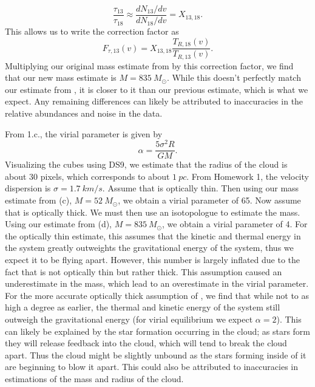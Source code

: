 \documentclass[11pt]{article}
\newenvironment{tight_enumerate}{
\begin{enumerate}[label=(\alph*)]
\setlength{\itemsep}{3pt}
\setlength{\parskip}{0pt}
}{\end{enumerate}}
\begin{document}
\begin{tight_enumerate}
\[\frac{\tau_{13}}{\tau_{18}} \approx \frac{dN_{13}/dv}{dN_{18}/dv} = X_{13,18}.\]
This allows us to write the correction factor as 
\[F_{\tau,13}(v) = X_{13,18}\frac{T_{R,18}(v)}{T_{R,13}(v)}.\]
Multiplying our original mass estimate from  by this correction factor, we find that our new mass estimate is $M = 835\ M_{\odot}$. While this doesn't perfectly match our estimate from , it is closer to it than our previous estimate, which is what we expect. Any remaining differences can likely be attributed to inaccuracies in the relative abundances and noise in the data. 
\item From 1.c., the virial parameter is given by 
\[\alpha = \frac{5\sigma^{2}R}{GM}.\]
Visualizing the cubes using DS9, we estimate that the radius of the cloud is about $30$ pixels, which corresponds to about $1\ \si{pc}$. From Homework 1, the velocity dispersion is $\sigma = 1.7\ \si{km/s}$. Assume that  is optically thin. Then using our mass estimate from (c), $M = 52\ M_{\odot}$, we obtain a virial parameter of 65. Now assume that  is optically thick. We must then use an isotopologue to estimate the mass. Using our estimate from (d), $M = 835\ M_{\odot}$, we obtain a virial parameter of 4. For the optically thin estimate, this assumes that the kinetic and thermal energy in the system greatly outweights the gravitational energy of the system, thus we expect it to be flying apart. However, this number is largely inflated due to the fact that  is not optically thin but rather thick. This assumption caused an underestimate in the mass, which lead to an overestimate in the virial parameter. For the more accurate optically thick assumption of , we find that while not to as high a degree as earlier, the thermal and kinetic energy of the system still outweigh the gravitational energy (for virial equilibrium we expect $\alpha = 2$). This can likely be explained by the star formation occurring in the cloud; as stars form they will release feedback into the cloud, which will tend to break the cloud apart. Thus the cloud might be slightly unbound as the stars forming inside of it are beginning to blow it apart. This could also be attributed to inaccuracies in estimations of the mass and radius of the cloud.
\end{tight_enumerate}
\end{document}
